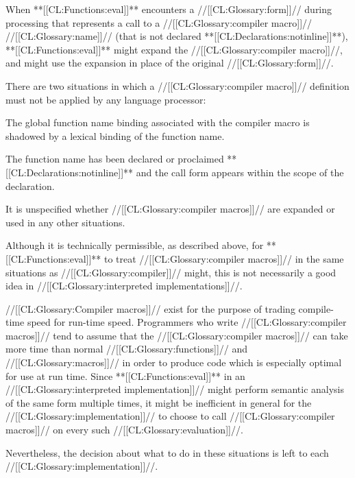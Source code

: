 When **[[CL:Functions:eval]]** encounters a //[[CL:Glossary:form]]// during processing that represents 
a call to a //[[CL:Glossary:compiler macro]]// //[[CL:Glossary:name]]// (that is not declared **[[CL:Declarations:notinline]]**),
**[[CL:Functions:eval]]** might expand the //[[CL:Glossary:compiler macro]]//,
and might use the expansion in place of the original //[[CL:Glossary:form]]//.

There are two situations in which a //[[CL:Glossary:compiler macro]]// definition must not be
applied by any language processor:

\beginlist
\itemitem{\bull}
 The global function name binding associated with the compiler
 macro is shadowed by a lexical binding of the function name.

\itemitem{\bull}
 The function name has been declared or proclaimed **[[CL:Declarations:notinline]]** and
 the call form appears within the scope of the declaration.
\endlist

It is unspecified whether //[[CL:Glossary:compiler macros]]// are expanded or used in any other
situations.


Although it is technically permissible, as described above,
for **[[CL:Functions:eval]]** to treat //[[CL:Glossary:compiler macros]]// in the same situations
as //[[CL:Glossary:compiler]]// might, this is not necessarily a good idea in
//[[CL:Glossary:interpreted implementations]]//.

//[[CL:Glossary:Compiler macros]]// exist for the purpose of trading compile-time speed
for run-time speed.  Programmers who write //[[CL:Glossary:compiler macros]]// tend to
assume that the //[[CL:Glossary:compiler macros]]// can take more time than normal //[[CL:Glossary:functions]]//
and //[[CL:Glossary:macros]]// in order to produce code which is especially optimal for use
at run time.  Since **[[CL:Functions:eval]]** in an //[[CL:Glossary:interpreted implementation]]//
might perform semantic analysis of the same form multiple times, it might be 
inefficient in general for the //[[CL:Glossary:implementation]]// to choose to call
//[[CL:Glossary:compiler macros]]// on every such //[[CL:Glossary:evaluation]]//.

Nevertheless, the decision about what to do in these situations is left to
each //[[CL:Glossary:implementation]]//.

\endsubsubsubsubsection%

